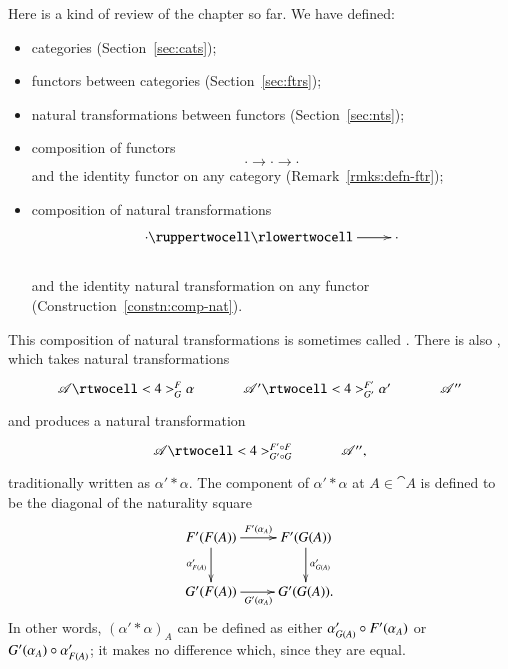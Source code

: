 \begin{remarks}
\label{rmks:2-cat-CAT}
Here is a kind of review of the chapter so far.  We have defined:
%
\begin{itemize}
\item
categories (Section~\ref{sec:cats});

\item
functors between categories (Section~\ref{sec:ftrs});

\item
natural transformations between functors (Section~\ref{sec:nts});

\item
composition of functors
\[
\cdot \to \cdot \to \cdot
\]
and the identity functor on any category
(Remark~\ref{rmks:defn-ftr});

\item
composition of natural transformations%
%
%
\vspace{-3ex}
\[
\xymatrix{
\cdot
\ruppertwocell
\ar[r]
\rlowertwocell
&
\cdot
}
\]
\vspace{-4ex}\\
%
and the identity natural transformation on any functor
(Construction~\ref{constn:comp-nat}).
\end{itemize}
%
This composition of natural transformations is sometimes called
.  There is also , which takes natural transformations
\[
\xymatrix@C+.5em{
\cat{A} \rtwocell<4>^F_G{\alpha}   &
\cat{A}' \rtwocell<4>^{F'}_{G'}{\alpha'}   &
\cat{A}''
}
\]
and produces a natural transformation
\[
\xymatrix@C+.5em{
\cat{A} \rtwocell<4>^{F' \of F}_{G' \of G} &\cat{A}'',
}
\]
traditionally written as $\alpha' * \alpha$.%
%
%
The component of $\alpha' * \alpha$ at $A \in \cat{A}$ is defined to be
the diagonal of the naturality square
\[
\xymatrix{
F'(F(A)) \ar[r]^{F'(\alpha_A)} \ar[d]_{\alpha'_{F(A)}}  &
F'(G(A)) \ar[d]^{\alpha'_{G(A)}}        \\
G'(F(A)) \ar[r]_{G'(\alpha_A)}  &
G'(G(A)).
}
\]
In other words, $(\alpha' * \alpha)_A$ can be defined as either
$\alpha'_{G(A)} \mathbin{\circ} F'(\alpha_A)$ or $G'(\alpha_A) \mathbin{\circ} \alpha'_{F(A)}$; it
makes no difference which, since they are equal.


\end{remarks}
